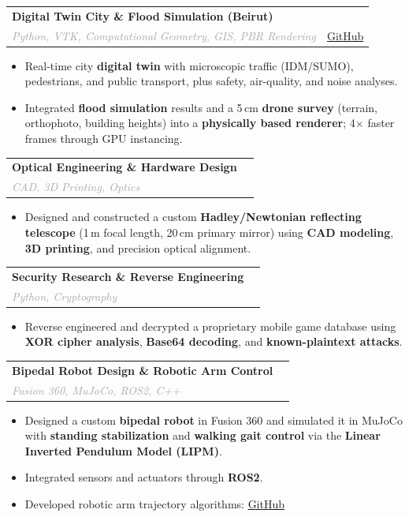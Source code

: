 \documentclass[10pt, a4paper]{article}
\makeatletter
\newcommand{\cvitem}[4]{
    \noindent
    \begin{tabularx}{\textwidth}{@{}X r@{}}
        \textbf{#1} & \textcolor{primary}{\textbf{#2}} \\
        \textit{\textcolor{darkgray}{#3}} & \textcolor{lightgray}{\small #4} \\
    \end{tabularx}
    \vspace{2pt}
}
\makeatother
\begin{document}
\vspace{0.35em}

\cvitem
{Digital Twin City \& Flood Simulation (Beirut)}
{}
{Python, VTK, Computational Geometry, GIS, PBR Rendering}
{\href{https://github.com/Kostantinoskanell/Comutational-Geometry-Digital-Twin-City}{GitHub}}

\begin{itemize}[leftmargin=1.2em, topsep=0pt, itemsep=1pt]
    \item Real-time city \textbf{digital twin} with microscopic traffic (IDM/SUMO), pedestrians, and public transport, plus safety, air-quality, and noise analyses.
    \item Integrated \textbf{flood simulation} results and a 5\,cm \textbf{drone survey} (terrain, orthophoto, building heights) into a \textbf{physically based renderer}; 4$\times$ faster frames through GPU instancing.
\end{itemize}

\vspace{0.35em}

\cvitem
{Optical Engineering \& Hardware Design}
{}
{CAD, 3D Printing, Optics}
{}

\begin{itemize}[leftmargin=1.2em, topsep=0pt, itemsep=1pt]
    \item Designed and constructed a custom \textbf{Hadley/Newtonian reflecting telescope} (1\,m focal length, 20\,cm primary mirror) using \textbf{CAD modeling}, \textbf{3D printing}, and precision optical alignment.
\end{itemize}

\vspace{0.35em}

\cvitem
{Security Research \& Reverse Engineering}
{}
{Python, Cryptography}
{}

\begin{itemize}[leftmargin=1.2em, topsep=0pt, itemsep=1pt]
    \item Reverse engineered and decrypted a proprietary mobile game database using \textbf{XOR cipher analysis}, \textbf{Base64 decoding}, and \textbf{known-plaintext attacks}.
\end{itemize}

\vspace{0.35em}

\cvitem
{Bipedal Robot Design \& Robotic Arm Control}
{}
{Fusion 360, MuJoCo, ROS2, C++}
{}

\begin{itemize}[leftmargin=1.2em, topsep=0pt, itemsep=1pt]
    \item Designed a custom \textbf{bipedal robot} in Fusion 360 and simulated it in MuJoCo with \textbf{standing stabilization} and \textbf{walking gait control} via the \textbf{Linear Inverted Pendulum Model (LIPM)}.
    \item Integrated sensors and actuators through \textbf{ROS2}.
    \item Developed robotic arm trajectory algorithms:
    \href{https://github.com/Kostantinoskanell/Robotic-Arm-Trajectory-Generation-University-of-Patras-Exercise}{GitHub}
\end{itemize}
\end{document}
